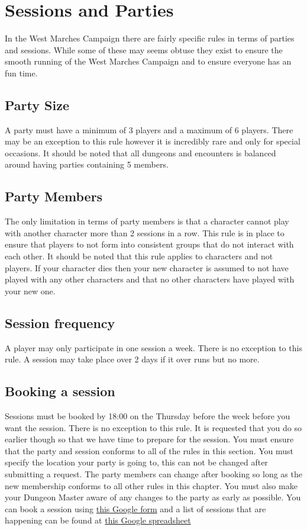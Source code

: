 \chapter{Sessions and Parties}
In the West Marches Campaign there are fairly specific rules in terms of parties and sessions. While some of these may seems obtuse they exist to ensure the smooth running of the West Marches Campaign and to ensure everyone has an fun time.
\section{Party Size}
A party must have a minimum of 3 players and a maximum of 6 players. There may be an exception to this rule however it is incredibly rare and only for special occasions. It should be noted that all dungeons and encounters is balanced around having parties containing 5 members.
\section{Party Members}
The only limitation in terms of party members is that a character cannot play with another character more than 2 sessions in a row.
This rule is in place to ensure that players to not form into consistent groups that do not interact with each other. \newline
It should be noted that this rule applies to characters and not players. If your character dies then your new character is assumed to not have played with any other characters and that no other characters have played with your new one.
\section{Session frequency}
A player may only participate in one session a week. There is no exception to this rule. A session may take place over 2 days if it over runs but no more.
\section{Booking a session}
Sessions must be booked by 18:00 on the Thursday before the week before you want the session. There is no exception to this rule. It is requested that you do so earlier though so that we have time to prepare for the session. You must ensure that the party and session conforms to all of the rules in this section. You must specify the location your party is going to, this can not be changed after submitting a request. \newline 
The party members can change after booking so long as the new membership conforms to all other rules in this chapter. You must also make your Dungeon Master aware of any changes to the party as early as possible. \newline
You can book a session using \href{ https://goo.gl/forms/rzNrDHNviYnMTSXA2}{this Google form} and a list of sessions that are happening can be found at \href{ https://docs.google.com/spreadsheets/d/1MQKPtY3KcZKCh2T7X1U4zbln39ESutp5Gm-XhqRATZ0/edit?usp=sharing}{this Google spreadsheet}
